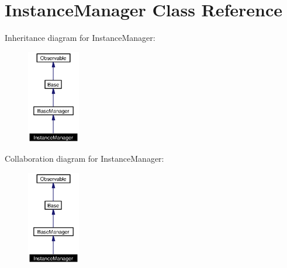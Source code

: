 \section{Instance\-Manager Class Reference}
\label{classInstanceManager}
Inheritance diagram for Instance\-Manager:\begin{figure}[H]
\begin{center}
\leavevmode
\includegraphics[width=65pt]{classInstanceManager__inherit__graph}
\end{center}
\end{figure}
Collaboration diagram for Instance\-Manager:\begin{figure}[H]
\begin{center}
\leavevmode
\includegraphics[width=65pt]{classInstanceManager__coll__graph}
\end{center}
\end{figure}
